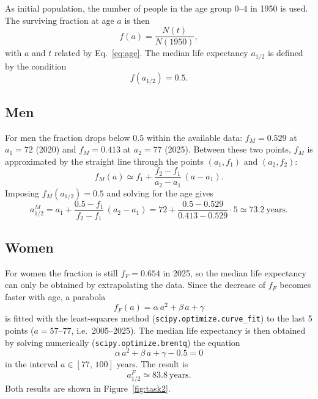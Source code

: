 \documentclass[11pt,a4paper]{article}
\begin{document}
	\vspace{0.2cm}
	
	As initial population, the number of people in the age group $0$--$4$ in 1950 is used.
	The surviving fraction at age $a$ is then
	\begin{equation}
		f(a) = \frac{N(t)}{N(1950)},
		\label{eq:fraction}
	\end{equation}
	with $a$ and $t$ related by Eq.~\eqref{eq:age}.
	The median life expectancy $a_{1/2}$ is defined by the condition
	\begin{equation}
		f(a_{1/2}) = 0.5 .
		\label{eq:median}
	\end{equation}
	
	\subsection*{Men}
	
	For men the fraction drops below $0.5$ within the available data: $f_M = 0.529$ at $a_1 = 72$ (2020) and $f_M = 0.413$ at $a_2 = 77$ (2025).
	Between these two points, $f_M$ is approximated by the straight line through the points $(a_1, f_1)$ and $(a_2, f_2)$:
	\begin{equation}
		f_M(a) \simeq f_1 + \frac{f_2 - f_1}{a_2 - a_1}\,(a - a_1).
	\end{equation}
	Imposing $f_M(a_{1/2}) = 0.5$ and solving for the age gives
	\begin{equation}
		a_{1/2}^{M} = a_1 + \frac{0.5 - f_1}{f_2 - f_1}\,(a_2 - a_1)
		= 72 + \frac{0.5 - 0.529}{0.413 - 0.529}\cdot 5
		\simeq 73.2~\text{years}.
	\end{equation}
	
	\subsection*{Women}
	
	For women the fraction is still $f_F = 0.654$ in 2025, so the median life expectancy can only be obtained by extrapolating the data.
	Since the decrease of $f_F$ becomes faster with age, a parabola
	\begin{equation}
		f_F(a) = \alpha\, a^2 + \beta\, a + \gamma
	\end{equation}
	is fitted with the least-squares method (\texttt{scipy.optimize.curve\_fit}) to the last 5 points ($a = 57$--$77$, i.e.\ 2005--2025).
	The median life expectancy is then obtained by solving numerically (\texttt{scipy.optimize.brentq}) the equation
	\begin{equation}
		\alpha\, a^2 + \beta\, a + \gamma - 0.5 = 0
	\end{equation}
	in the interval $a \in [77,\, 100]$ years. The result is
	\begin{equation}
		a_{1/2}^{F} \simeq 83.8~\text{years}.
	\end{equation}
	Both results are shown in Figure~\ref{fig:task2}.
	
\end{document}
